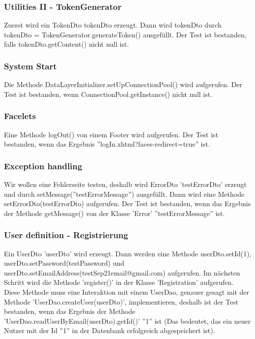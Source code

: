 \documentclass{article}
\begin{document}
\subsubsection{Utilities II - TokenGenerator}
Zuerst wird ein TokenDto tokenDto erzeugt. Dann wird tokenDto durch tokenDto = TokenGenerator.generateToken() ausgefüllt. Der Test ist bestanden, falls tokenDto.getContent() nicht null ist.

\subsubsection{System Start}
Die Methode DataLayerInitializer.setUpConnectionPool() wird aufgerufen. Der Test ist bestanden, wenn ConnectionPool.getInstance() nicht null ist.

\subsubsection{Facelets}
Eine Methode logOut() von einem Footer wird aufgerufen. Der Test ist bestanden, wenn das Ergebnis ''logIn.xhtml?faces-redirect=true'' ist.

\subsubsection{Exception handling}
Wir wollen eine Fehlerseite testen, deshalb wird ErrorDto 'testErrorDto' erzeugt und durch setMessage(''testErrorMessage'') ausgefüllt. Dann wird eine Methode setErrorDto(testErrorDto) aufgerufen. Der Test ist bestanden, wenn das Ergebnis der Methode getMessage() von der Klasse 'Error' ''testErrorMessage'' ist.

\subsubsection{User definition - Registrierung}
Ein UserDto 'userDto' wird erzeugt. Dann werden eine Methode userDto.setId(1), \linebreak userDto.setPassword(testPassword) und userDto.setEmailAddress(testSep21email@gmail.com) aufgerufen. Im nächsten Schritt wird die Methode 'register()' in der Klasse 'Registration' aufgerufen. Diese Methode muss eine Interaktion mit einem UserDao, genauer gesagt mit der Methode 'UserDao.createUser(userDto)', implementieren, deshalb ist der Test bestanden, wenn das Ergebnis der Methode 'UserDao.readUserByEmail(userDto).getId()'  ''1'' ist (Das bedeutet, das ein neuer Nutzer mit der Id ''1'' in der Datenbank erfolgreich abgespeichert ist).
\end{document}
